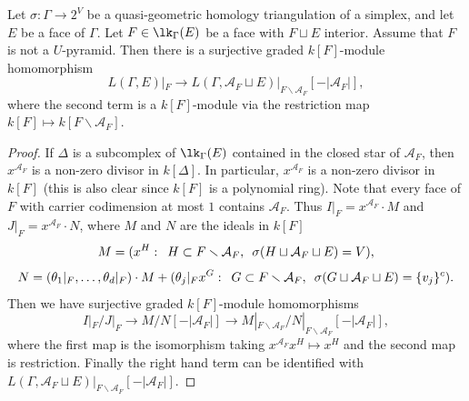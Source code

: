 \begin{lemma}\label{lem:restriction}
Let $\sigma\colon \Gamma \to 2^V$ be a quasi-geometric homology triangulation of a simplex, and let $E$ be a face of $\Gamma$. Let $F \in \lk_{\Gamma}(E)$ be a face with $F \sqcup E$ interior. Assume that $F$ is not a $U$-pyramid. 
Then there is a surjective graded $k[F]$-module homomorphism
$$L(\Gamma, E)|_{F} \to L(\Gamma, \mathcal{A}_F \sqcup E)|_{F \smallsetminus \mathcal{A}_F}[-\vert \mathcal{A}_F \vert],$$
where the second term is a $k[F]$-module via the restriction map  $k[F] \mapsto k[F \smallsetminus \mathcal{A}_F]$.
\end{lemma}



\begin{proof}
If $\Delta$ is a subcomplex of $\lk_{\Gamma}(E)$ contained in the closed star of $\mathcal{A}_F$, then $x^{\mathcal{A}_F}$ is a non-zero divisor in $k[\Delta]$. In particular, $x^{\mathcal{A}_F}$ is a non-zero divisor in $k[F]$ (this is also clear since $k[F]$ is a polynomial ring). Note that every face of $F$ with carrier codimension at most $1$ contains $\mathcal{A}_F$. Thus $I|_F = x^{\mathcal{A}_F} \cdot M$ and $J|_F = x^{\mathcal{A}_F} \cdot N$, where 
$M$ and $N$ are the ideals in $k[F]$ 
\[
M = (x^H: \enskip H \subset F \smallsetminus \mathcal{A}_F, \enskip \sigma(H \sqcup \mathcal{A}_F \sqcup E) = V),
\]
\[
N = (\theta_1|_F,\ldots,\theta_{d}|_F) \cdot M + (\theta_{j}|_{F} x^G: \enskip G \subset F \smallsetminus \mathcal{A}_F, \enskip \sigma(G \sqcup \mathcal{A}_F \sqcup E) = \{v_j\}^c).
\]
Then we have surjective graded $k[F]$-module homomorphisms
\[
I|_F/J|_F \rightarrow M /N [-|\mathcal{A}_F|] \rightarrow  M|_{F \smallsetminus \mathcal{A}_F}/N|_{F \smallsetminus \mathcal{A}_F}[-|\mathcal{A}_F|], 
\]
where the first map is the isomorphism taking $x^{\mathcal{A}_F} x^H \mapsto x^H$ and the second map is restriction. Finally the right hand term can be identified with $L(\Gamma, \mathcal{A}_F \sqcup E)|_{F \smallsetminus \mathcal{A}_F}[-\vert \mathcal{A}_F \vert]$.
\end{proof}
